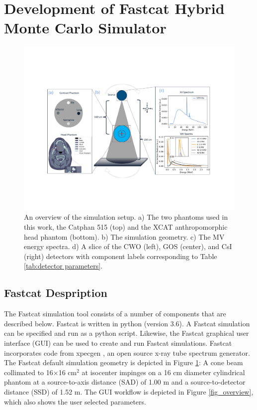 

\section{Development of Fastcat Hybrid Monte Carlo Simulator}

\begin{figure}[!ht]
   \begin{center}
   \includegraphics[width=\textwidth,trim={3cm 4cm 2.8cm 4cm}, clip]{figures/Figure_1.pdf}
   \caption{
   An overview of the simulation setup. a) The two phantoms used in this work, the Catphan 515 (top) and the XCAT anthropomorphic head phantom (bottom). b) The simulation geometry. c) The MV energy spectra. d) A slice of the CWO (left), GOS (center), and CsI (right) detectors with component labels corresponding to Table \ref{tab:detector parameters}.
   \label{fig_setup_mtf} 
    }  %
    \end{center}
\end{figure}


\subsection{Fastcat Despription}

The Fastcat simulation tool consists of a number of components that are described below. Fastcat is written in python (version 3.6). A Fastcat simulation can be specified and run as a python script. Likewise, the Fastcat graphical user interface (GUI) can be used to create and run Fastcat simulations. Fastcat incorporates code from xpecgen \cite{Hernandez2016Xpecgen:Anodes}, an open source x-ray tube spectrum generator. The Fastcat default simulation geometry is depicted in Figure \ref{fig_setup_mtf}: A cone beam collimated to 16$\times$16 cm$^2$ at isocenter impinges on a 16 cm diameter cylindrical phantom at a source-to-axis distance (SAD) of 1.00 m and a source-to-detector distance (SSD) of 1.52 m. The GUI workflow is depicted in Figure \ref{fig_overview}, which also shows the user selected parameters.


